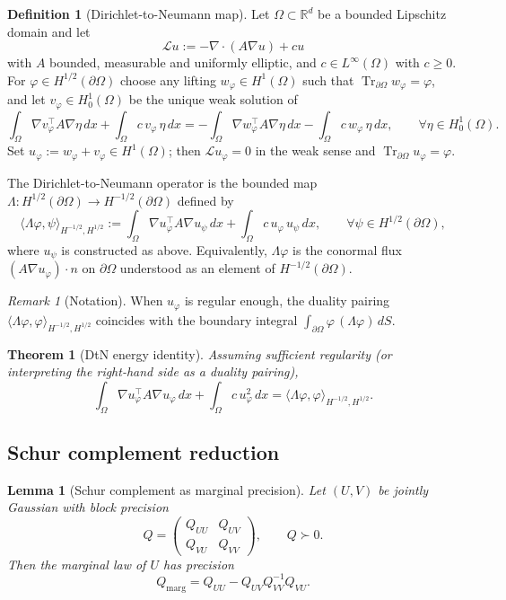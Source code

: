 \documentclass[11pt]{article}
\theoremstyle{definition}
\newtheorem{definition}{Definition}[section]
\theoremstyle{plain}
\newtheorem{theorem}{Theorem}[section]
\newtheorem{lemma}{Lemma}[section]
\theoremstyle{remark}
\newtheorem{remark}{Remark}[section]
\newcommand{\R}{\mathbb{R}}
\newcommand{\trB}{\operatorname{Tr}_{\partial\Omega}}
\begin{document}
\begin{definition}[Dirichlet-to-Neumann map]\label{def:dtn}
Let $\Omega\subset\R^d$ be a bounded Lipschitz domain and let
\[
\mathcal{L}u := -\nabla\cdot(A\nabla u)+cu
\]
with $A$ bounded, measurable and uniformly elliptic, and $c\in L^\infty(\Omega)$ with $c\ge 0$.
For $\varphi\in H^{1/2}(\partial\Omega)$ choose any lifting $w_\varphi\in H^1(\Omega)$ such that
$\trB w_\varphi=\varphi$, and let $v_\varphi\in H^1_0(\Omega)$ be the unique weak solution of
\[
\int_\Omega \nabla v_\varphi^\top A\nabla \eta\,dx+\int_\Omega c\,v_\varphi\,\eta\,dx
=
-\int_\Omega \nabla w_\varphi^\top A\nabla \eta\,dx-\int_\Omega c\,w_\varphi\,\eta\,dx,
\qquad \forall \eta\in H^1_0(\Omega).
\]
Set $u_\varphi:=w_\varphi+v_\varphi\in H^1(\Omega)$; then $\mathcal{L}u_\varphi=0$ in the weak sense and
$\trB u_\varphi=\varphi$.

The Dirichlet-to-Neumann operator is the bounded map $\Lambda:H^{1/2}(\partial\Omega)\to H^{-1/2}(\partial\Omega)$ defined by
\[
\langle \Lambda\varphi,\psi\rangle_{H^{-1/2},H^{1/2}}
:=\int_\Omega \nabla u_\varphi^\top A\nabla u_\psi\,dx+\int_\Omega c\,u_\varphi\,u_\psi\,dx,
\qquad \forall \psi\in H^{1/2}(\partial\Omega),
\]
where $u_\psi$ is constructed as above. Equivalently, $\Lambda\varphi$ is the conormal flux
$(A\nabla u_\varphi)\cdot n$ on $\partial\Omega$ understood as an element of $H^{-1/2}(\partial\Omega)$.
\end{definition}

\begin{remark}[Notation]
When $u_\varphi$ is regular enough, the duality pairing
$\langle \Lambda\varphi,\varphi\rangle_{H^{-1/2},H^{1/2}}$ coincides with the boundary integral
$\int_{\partial\Omega}\varphi\,(\Lambda\varphi)\,dS$.
\end{remark}

\begin{theorem}[DtN energy identity]\label{thm:dtn}
Assuming sufficient regularity (or interpreting the right-hand side as a duality pairing),
\[
\int_\Omega \nabla u_\varphi^\top A\nabla u_\varphi\,dx+\int_\Omega c\,u_\varphi^2\,dx
=\langle \Lambda\varphi,\varphi\rangle_{H^{-1/2},H^{1/2}}.
\]
\end{theorem}

\subsection{Schur complement reduction}

\begin{lemma}[Schur complement as marginal precision]\label{lem:schur}
Let $(U,V)$ be jointly Gaussian with block precision
\[
Q=\begin{pmatrix}
Q_{UU}&Q_{UV}\\
Q_{VU}&Q_{VV}
\end{pmatrix},\qquad Q\succ 0.
\]
Then the marginal law of $U$ has precision
\[
Q_{\mathrm{marg}}=Q_{UU}-Q_{UV}Q_{VV}^{-1}Q_{VU}.
\]
\end{lemma}
\end{document}

